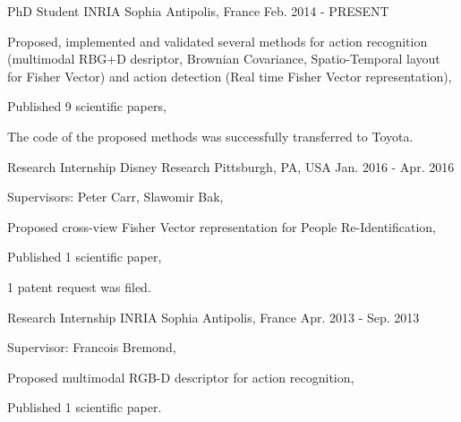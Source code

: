 

\begin{cventries}

  \cventry
    {PhD Student} %
    {INRIA} %
    {Sophia Antipolis, France} %
    {Feb. 2014 - PRESENT} %
    {
      \begin{cvitems} %
        \item {Proposed, implemented and validated several methods for action recognition (multimodal RBG+D desriptor, Brownian Covariance, Spatio-Temporal layout for Fisher Vector) and action detection (Real time Fisher Vector representation), }
        \item {Published 9 scientific papers,}
        \item {The code of the proposed methods was successfully transferred to Toyota.}
      \end{cvitems}
    }

  \cventry
    {Research Internship} %
    {Disney Research} %
    {Pittsburgh, PA, USA} %
    {Jan. 2016 - Apr. 2016} %
    {
      \begin{cvitems} %
        \item {Supervisors: Peter Carr, Slawomir Bak,}
        \item {Proposed cross-view Fisher Vector representation for People Re-Identification,}
        \item {Published 1 scientific paper,}
        \item {1 patent request was filed.}        
      \end{cvitems}
    }

  \cventry
    {Research Internship} %
    {INRIA} %
    {Sophia Antipolis, France} %
    {Apr. 2013 - Sep. 2013} %
    {
      \begin{cvitems} %
        \item {Supervisor: Francois Bremond,}
        \item {Proposed multimodal RGB-D descriptor for action recognition,}
        \item {Published 1 scientific paper.}
      \end{cvitems}
    }


\end{cventries}
